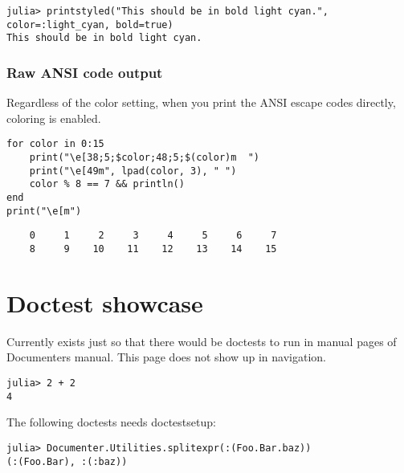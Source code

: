 \begin{verbatim}
julia> printstyled("This should be in bold light cyan.", color=:light_cyan, bold=true)
This should be in bold light cyan.
\end{verbatim}



\subsubsection{Raw ANSI code output}



\label{13267379516757075300}{}


Regardless of the color setting, when you print the ANSI escape codes directly, coloring is enabled.




\begin{verbatim}
for color in 0:15
    print("\e[38;5;$color;48;5;$(color)m  ")
    print("\e[49m", lpad(color, 3), " ")
    color % 8 == 7 && println()
end
print("\e[m")
\end{verbatim}


\begin{verbatim}
    0     1     2     3     4     5     6     7
    8     9    10    11    12    13    14    15

\end{verbatim}



\section{Doctest showcase}



\label{2602340166667619136}{}


Currently exists just so that there would be doctests to run in manual pages of Documenter{\textquotesingle}s manual. This page does not show up in navigation.




\begin{verbatim}
julia> 2 + 2
4
\end{verbatim}



The following doctests needs doctestsetup:




\begin{verbatim}
julia> Documenter.Utilities.splitexpr(:(Foo.Bar.baz))
(:(Foo.Bar), :(:baz))
\end{verbatim}



